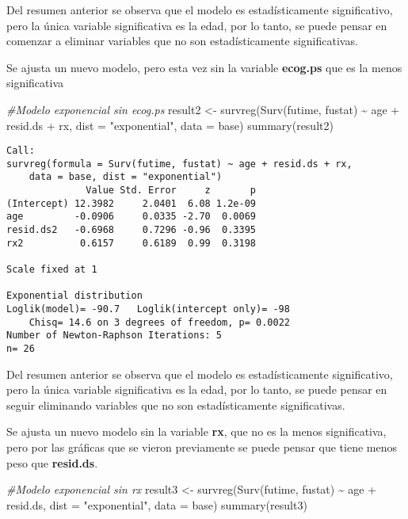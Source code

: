 \documentclass[
]{article}
\newenvironment{Shaded}{\begin{snugshade}}{\end{snugshade}}
\newcommand{\AttributeTok}[1]{\textcolor[rgb]{0.77,0.63,0.00}{#1}}
\newcommand{\CommentTok}[1]{\textcolor[rgb]{0.56,0.35,0.01}{\textit{#1}}}
\newcommand{\FunctionTok}[1]{\textcolor[rgb]{0.00,0.00,0.00}{#1}}
\newcommand{\NormalTok}[1]{#1}
\newcommand{\OtherTok}[1]{\textcolor[rgb]{0.56,0.35,0.01}{#1}}
\newcommand{\SpecialCharTok}[1]{\textcolor[rgb]{0.00,0.00,0.00}{#1}}
\newcommand{\StringTok}[1]{\textcolor[rgb]{0.31,0.60,0.02}{#1}}
\begin{document}
Del resumen anterior se observa que el modelo es estadísticamente
significativo, pero la única variable significativa es la edad, por lo
tanto, se puede pensar en comenzar a eliminar variables que no son
estadísticamente significativas.

Se ajusta un nuevo modelo, pero esta vez sin la variable
\textbf{ecog.ps} que es la menos significativa

\begin{Shaded}
\begin{Highlighting}[]
\CommentTok{\#Modelo exponencial sin ecog.ps}
\NormalTok{result2 }\OtherTok{\textless{}{-}} \FunctionTok{survreg}\NormalTok{(}\FunctionTok{Surv}\NormalTok{(futime, fustat) }\SpecialCharTok{\textasciitilde{}}\NormalTok{ age }\SpecialCharTok{+}\NormalTok{ resid.ds }\SpecialCharTok{+}\NormalTok{ rx, }\AttributeTok{dist =} \StringTok{"exponential"}\NormalTok{, }\AttributeTok{data =}\NormalTok{ base)}
\FunctionTok{summary}\NormalTok{(result2)}
\end{Highlighting}
\end{Shaded}

\begin{verbatim}
Call:
survreg(formula = Surv(futime, fustat) ~ age + resid.ds + rx, 
    data = base, dist = "exponential")
              Value Std. Error     z       p
(Intercept) 12.3982     2.0401  6.08 1.2e-09
age         -0.0906     0.0335 -2.70  0.0069
resid.ds2   -0.6968     0.7296 -0.96  0.3395
rx2          0.6157     0.6189  0.99  0.3198

Scale fixed at 1 

Exponential distribution
Loglik(model)= -90.7   Loglik(intercept only)= -98
    Chisq= 14.6 on 3 degrees of freedom, p= 0.0022 
Number of Newton-Raphson Iterations: 5 
n= 26 
\end{verbatim}

Del resumen anterior se observa que el modelo es estadísticamente
significativo, pero la única variable significativa es la edad, por lo
tanto, se puede pensar en seguir eliminando variables que no son
estadísticamente significativas.

Se ajusta un nuevo modelo sin la variable \textbf{rx}, que no es la
menos significativa, pero por las gráficas que se vieron previamente se
puede pensar que tiene menos peso que \textbf{resid.ds}.

\begin{Shaded}
\begin{Highlighting}[]
\CommentTok{\#Modelo exponencial sin rx}
\NormalTok{result3 }\OtherTok{\textless{}{-}} \FunctionTok{survreg}\NormalTok{(}\FunctionTok{Surv}\NormalTok{(futime, fustat) }\SpecialCharTok{\textasciitilde{}}\NormalTok{ age }\SpecialCharTok{+}\NormalTok{ resid.ds, }\AttributeTok{dist =} \StringTok{"exponential"}\NormalTok{, }\AttributeTok{data =}\NormalTok{ base)}
\FunctionTok{summary}\NormalTok{(result3)}
\end{Highlighting}
\end{Shaded}
\end{document}
